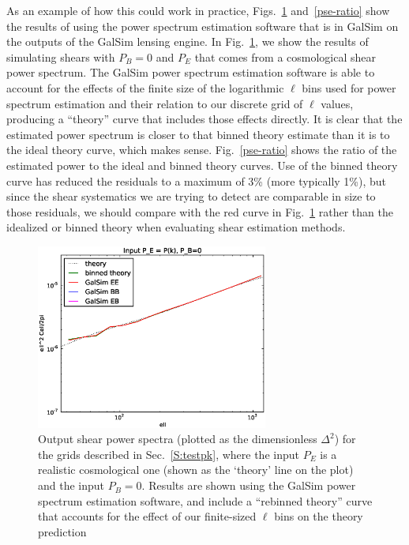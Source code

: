 \documentclass[preprint]{aastex}
\begin{document}
As an example of how this could work in practice, Figs.~\ref{pse}
and~\ref{pse-ratio} show the results of using the power spectrum
estimation software that is in GalSim on the outputs of the GalSim
lensing engine.  In Fig.~\ref{pse}, we show the results of simulating
shears with $P_B=0$ and $P_E$ that comes from a cosmological shear
power spectrum.  The GalSim power spectrum estimation software is able
to account for the effects of the finite size of the logarithmic
$\ell$ bins used for power spectrum estimation and their relation to
our discrete grid of $\ell$ values, producing a ``theory''
curve that includes those effects directly.  It is clear that the
estimated power spectrum is closer to that binned theory estimate than
it is to the ideal theory curve, which makes sense.
Fig.~\ref{pse-ratio} shows the ratio of the estimated power to the
ideal and binned theory curves.  Use of the binned theory curve has
reduced the residuals to a maximum of 3\% (more typically 1\%), but
since the shear systematics we are trying to detect are comparable in
size to those residuals, we should compare with the red curve in
Fig.~\ref{pse} rather than the idealized or binned theory when
evaluating shear estimation methods.
\begin{figure}
\begin{center}
\includegraphics[width=3in]{../external/test_gridshear/output/compare_input_pe.pse.eps}
\caption{Output shear power spectra (plotted as the dimensionless
  $\Delta^2$) for the grids described in Sec.~\ref{S:testpk}, where
  the input $P_E$ is a realistic cosmological one (shown as the `theory' line on
  the plot) and the input $P_B=0$. Results are shown using the GalSim
  power spectrum estimation software, and include a ``rebinned
  theory'' curve that accounts for the effect of our finite-sized
  $\ell$ bins on the theory prediction\label{pse}}
\end{center}
\end{figure}
\end{document}

